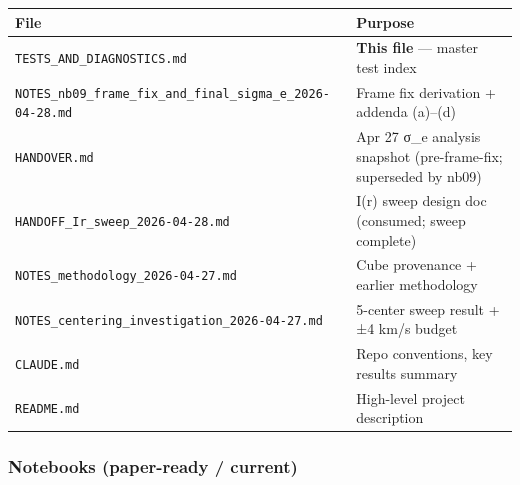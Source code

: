 \documentclass[
  10pt,
]{article}
\begin{document}
\begingroup\small\setlength{\tabcolsep}{4pt}\begin{longtable}[]{@{}ll@{}}
\toprule
File & Purpose \\
\midrule
\endhead
\texttt{TESTS\_AND\_DIAGNOSTICS.md} & \textbf{This file} --- master test index \\
\texttt{NOTES\_nb09\_frame\_fix\_and\_final\_sigma\_e\_2026-04-28.md} & Frame fix derivation + addenda (a)--(d) \\
\texttt{HANDOVER.md} & Apr 27 σ\_e analysis snapshot (pre-frame-fix; superseded by nb09) \\
\texttt{HANDOFF\_Ir\_sweep\_2026-04-28.md} & I(r) sweep design doc (consumed; sweep complete) \\
\texttt{NOTES\_methodology\_2026-04-27.md} & Cube provenance + earlier methodology \\
\texttt{NOTES\_centering\_investigation\_2026-04-27.md} & 5-center sweep result + ±4 km/s budget \\
\texttt{CLAUDE.md} & Repo conventions, key results summary \\
\texttt{README.md} & High-level project description \\
\bottomrule
\end{longtable}\endgroup

\hypertarget{notebooks-paper-ready-current}{%
\subsubsection{Notebooks (paper-ready / current)}\label{notebooks-paper-ready-current}}
\end{document}
